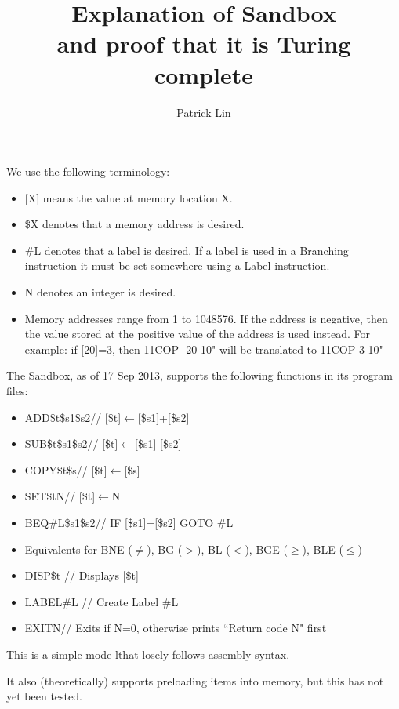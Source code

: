 \documentclass{article}
\title{Explanation of Sandbox\\\normalsize{and proof that it is Turing complete}}
\author{Patrick Lin}
\newcommand{\get}{$\gets$}
\begin{document}
\maketitle

We use the following terminology:

\begin{itemize}
\item {[X]} means the value at memory location X.
\item \$X denotes that a memory address is desired.
\item \#L denotes that a label is desired. If a label is used in a Branching instruction it must be set somewhere using a Label instruction.
\item N denotes an integer is desired.
\item Memory addresses range from 1 to 1048576. If the address is negative, then the value stored at the positive value of the address is used instead. For example: if [20]=3, then 11COP -20 10" will be translated to 11COP 3 10"
\end{itemize}

The Sandbox, as of 17 Sep 2013, supports the following functions in its program files:

\begin{itemize}
\item ADD\quad\$t\quad\$s1\quad\$s2\qquad// [\$t]\get[\$s1]+[\$s2]
\item SUB\quad\$t\quad\$s1\quad\$s2\qquad// [\$t]\get[\$s1]-[\$s2]
\item COPY\quad\$t\quad\$s\qquad// [\$t]\get[\$s]
\item SET\quad\$t\quad N\qquad// [\$t]\get N
\item BEQ\quad\#L\quad\$s1\quad\$s2\qquad// IF [\$s1]=[\$s2] GOTO \#L
\item Equivalents for BNE ($\ne$), BG ($>$), BL ($<$), BGE ($\ge$), BLE ($\le$)
\item DISP\quad\$t \qquad// Displays [\$t]
\item LABEL\quad\#L \qquad// Create Label \#L
\item EXIT\quad N\qquad// Exits if N=0, otherwise prints ``Return code N" first
\end{itemize}

This is a simple mode lthat losely follows assembly syntax.

It also (theoretically) supports preloading items into memory, but this has not yet been tested.

\pagebreak
\end{document}
